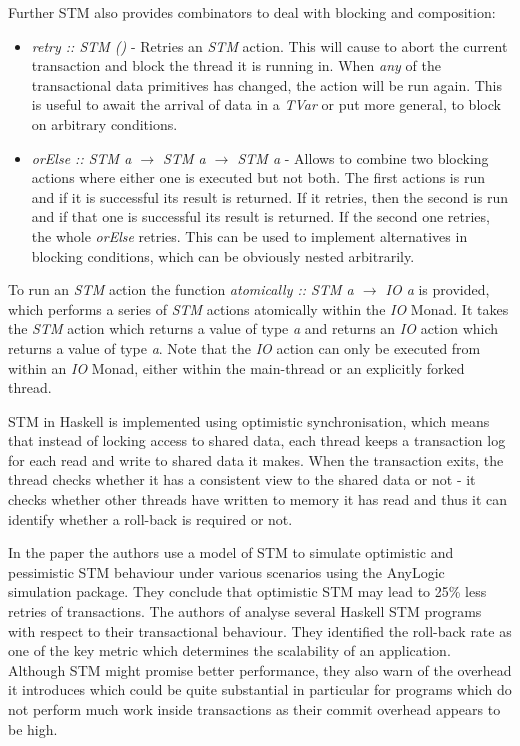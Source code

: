 Further STM also provides combinators to deal with blocking and composition:

\begin{itemize}
	\item \textit{retry :: STM ()} - Retries an \textit{STM} action. This will cause to abort the current transaction and block the thread it is running in. When \textit{any} of the transactional data primitives has changed, the action will be run again. This is useful to await the arrival of data in a \textit{TVar} or put more general, to block on arbitrary conditions. 
	
	\item \textit{orElse :: STM a $\rightarrow$ STM a $\rightarrow$ STM a} - Allows to combine two blocking actions where either one is executed but not both. The first actions is run and if it is successful its result is returned. If it retries, then the second is run and if that one is successful its result is returned. If the second one retries, the whole \textit{orElse} retries. This can be used to implement alternatives in blocking conditions, which can be obviously nested arbitrarily.
\end{itemize}

To run an \textit{STM} action the function \textit{atomically :: STM a $\rightarrow$ IO a} is provided, which performs a series of \textit{STM} actions atomically within the \textit{IO} Monad. It takes the \textit{STM} action which returns a value of type \textit{a} and returns an \textit{IO} action which returns a value of type \textit{a}. Note that the \textit{IO} action can only be executed from within an \textit{IO} Monad, either within the main-thread or an explicitly forked thread.

STM in Haskell is implemented using optimistic synchronisation, which means that instead of locking access to shared data, each thread keeps a transaction log for each read and write to shared data it makes. When the transaction exits, the thread checks whether it has a consistent view to the shared data or not - it checks whether other threads have written to memory it has read and thus it can identify whether a roll-back is required or not. %

In the paper \cite{heindl_modeling_2009} the authors use a model of STM to simulate optimistic and pessimistic STM behaviour under various scenarios using the AnyLogic simulation package. They conclude that optimistic STM may lead to 25\% less retries of transactions. The authors of \cite{perfumo_limits_2008} analyse several Haskell STM programs with respect to their transactional behaviour. They identified the roll-back rate as one of the key metric which determines the scalability of an application. Although STM might promise better performance, they also warn of the overhead it introduces which could be quite substantial in particular for programs which do not perform much work inside transactions as their commit overhead appears to be high.

